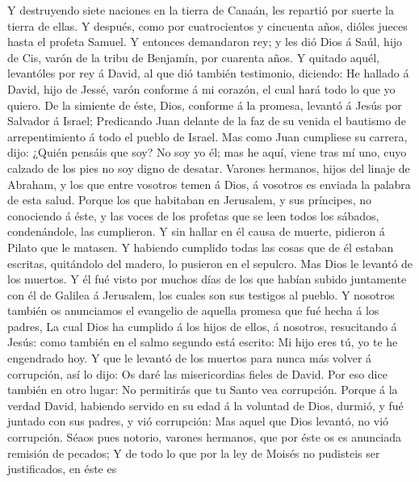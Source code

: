 Y destruyendo siete naciones en la tierra de Canaán, les repartió por
suerte la tierra de ellas.  Y después, como por
cuatrocientos y cincuenta años, dióles jueces hasta el profeta Samuel.
 Y entonces demandaron rey; y les dió Dios á Saúl, hijo
de Cis, varón de la tribu de Benjamín, por cuarenta años.
 Y quitado aquél, levantóles por rey á David, al que dió
también testimonio, diciendo: He hallado á David, hijo de Jessé, varón
conforme á mi corazón, el cual hará todo lo que yo quiero.
 De la simiente de éste, Dios, conforme á la promesa,
levantó á Jesús por Salvador á Israel;  Predicando Juan
delante de la faz de su venida el bautismo de arrepentimiento á todo el
pueblo de Israel.  Mas como Juan cumpliese su carrera,
dijo: ¿Quién pensáis que soy? No soy yo él; mas he aquí, viene tras mí
uno, cuyo calzado de los pies no soy digno de desatar. 
Varones hermanos, hijos del linaje de Abraham, y los que entre vosotros
temen á Dios, á vosotros es enviada la palabra de esta salud.
 Porque los que habitaban en Jerusalem, y sus príncipes,
no conociendo á éste, y las voces de los profetas que se leen todos los
sábados, condenándole, las cumplieron.  Y sin hallar en
él causa de muerte, pidieron á Pilato que le matasen.  Y
habiendo cumplido todas las cosas que de él estaban escritas, quitándolo
del madero, lo pusieron en el sepulcro.  Mas Dios le
levantó de los muertos.  Y él fué visto por muchos días
de los que habían subido juntamente con él de Galilea á Jerusalem, los
cuales son sus testigos al pueblo.  Y nosotros también os
anunciamos el evangelio de aquella promesa que fué hecha á los padres,
 La cual Dios ha cumplido á los hijos de ellos, á
nosotros, resucitando á Jesús: como también en el salmo segundo está
escrito: Mi hijo eres tú, yo te he engendrado hoy.  Y que
le levantó de los muertos para nunca más volver á corrupción, así lo
dijo: Os daré las misericordias fieles de David.  Por eso
dice también en otro lugar: No permitirás que tu Santo vea corrupción.
 Porque á la verdad David, habiendo servido en su edad á
la voluntad de Dios, durmió, y fué juntado con sus padres, y vió
corrupción:  Mas aquel que Dios levantó, no vió
corrupción.  Séaos pues notorio, varones hermanos, que
por éste os es anunciada remisión de pecados;  Y de todo
lo que por la ley de Moisés no pudisteis ser justificados, en éste es
